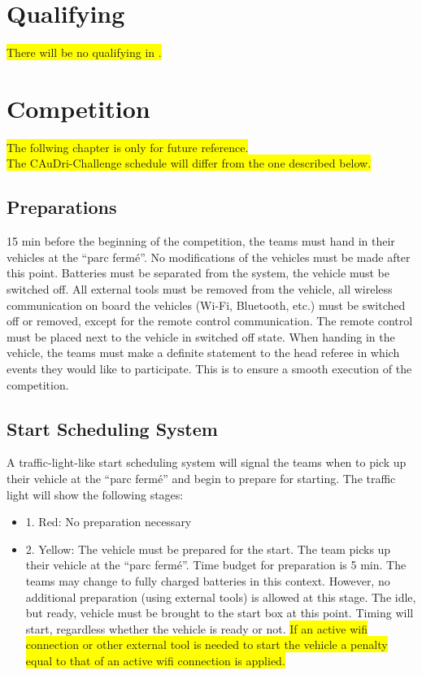 \documentclass[a4paper]{report}
\begin{document}
{{\section{Qualifying}

\colorbox{yellow}{There will be no qualifying in \the\year{}.} 

\section{Competition} 

\colorbox{yellow}{The follwing chapter is only for future reference.}\\ 
\colorbox{yellow}{The \the\year{} CAuDri-Challenge schedule will differ from the one described below.}

\subsection{Preparations} 

15 min before the beginning of the competition, the teams must hand in their vehicles at the “parc fermé”. No modifications of the vehicles must be made after this point. Batteries must be separated from the system, the vehicle must be switched off. All external tools must be removed from the vehicle, all wireless communication on board the vehicles (Wi-Fi, Bluetooth, etc.) must be switched off or removed, except for the remote control communication. The remote control must be placed next to the vehicle in switched off state. When handing in the vehicle, the teams must make a definite statement to the head referee in which events they would like to participate. This is to ensure a smooth execution of the competition. 

\subsection{Start Scheduling System}
\label{start_scheduling}

A traffic-light-like start scheduling system will signal the teams when to pick up their vehicle at the “parc fermé” and begin to prepare for starting. The traffic light will show the following stages: 

\begin{itemize}
\item 1. Red: No preparation necessary 

\item 2. Yellow: The vehicle must be prepared for the start. The team picks up their vehicle at the “parc fermé”. Time budget for preparation is 5 min. The teams may change to fully charged batteries in this context. However, no additional preparation (using external tools) is allowed at this stage. The idle, but ready, vehicle must be brought to the start box at this point. Timing will start, regardless whether the vehicle is ready or not. \colorbox{yellow}{If an active wifi connection or other external tool is needed to start the vehicle a penalty equal to that of an active wifi connection is applied.}


\end{itemize}}}
\end{document}
